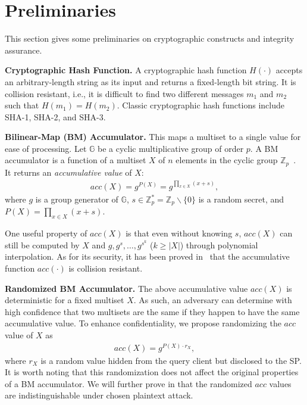 \section{Preliminaries}\label{chap:aggregate-queries:prelim}

This section gives some preliminaries on cryptographic constructs and integrity assurance.

\textbf{Cryptographic Hash Function.}
A cryptographic hash function $H(\cdot)$ accepts an arbitrary-length string as its input and returns a fixed-length bit string. It is collision resistant, i.e., it is difficult to find two different messages $m_1$ and $m_2$ such that $H(m_1) = H(m_2)$. Classic cryptographic hash functions include SHA-1, SHA-2, and SHA-3.

\textbf{Bilinear-Map (BM) Accumulator.} This maps a multiset to a single value for ease of processing. Let $\mathbb{G}$ be a cyclic multiplicative group of order $p$. A BM accumulator is a function of a multiset $X$ of $n$ elements in the cyclic group $\mathbb{Z}_p$~\cite{10.1007/978-3-540-30574-3_19}. It returns an \emph{accumulative value} of $X$:
\begin{align}
  acc(X) = g^{P(X)} = g^{\prod_{x\in{X}}{(x+s)}},
\end{align}
where $g$ is a group generator of $\mathbb{G}$, $s \in \mathbb{Z}_p^* = \mathbb{Z}_p\backslash\{0\}$ is a random secret, and $P(X) = \prod_{x\in{X}}{(x+s)}$.

One useful property of $acc(X)$ is that even without knowing $s$, $acc(X)$ can still be computed by $X$ and $g, g^s, \dots, g^{s^k}$ ($k \ge |X|$) through polynomial interpolation. As for its security, it has been proved in~\cite{10.1007/s00453-014-9968-3} that the accumulative function $acc(\cdot)$ is collision resistant.

\textbf{Randomized BM Accumulator.} The above accumulative value $acc(X)$ is deterministic for a fixed multiset $X$. As such, an adversary can determine with high confidence that two multisets are the same if they happen to have the same accumulative value. To enhance confidentiality, we propose  randomizing the $acc$ value of $X$ as
\begin{align}
  acc(X) = g^{P(X) \cdot r_X},\label{eqn:aggregate-queries:random-bm}
\end{align}
where $r_X$ is a random value hidden from the query client but disclosed to the SP\@. It is worth noting that this randomization does not affect the original properties of a BM accumulator. We will further prove in  that the randomized $acc$ values are indistinguishable under chosen plaintext attack.

